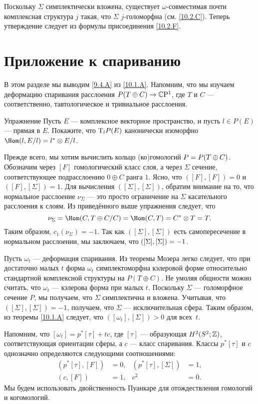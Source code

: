 Поскольку $\Sigma$ симплектически вложена, существует
$\omega$-совместимая почти комплексная структура $j$ такая, что
$\Sigma$ $j$-голоморфна (см. \ref{10.2.C}). 
Теперь утверждение следует из формулы присоединения \ref{10.2.F}. 
\qeds


\section{Приложение к спариванию}\label{sec:10.3}

В этом разделе мы выводим \ref{9.4.A} из \ref{10.1.A}.
Напомним, что мы изучаем деформацию спаривания расслоения $P(T \oplus C) \to \mathbb{C}\mathrm{P}^1$, где $T$ и $C$ — соответственно, тавтологическое и тривиальное расслоения. 

\begin{ex*}{Упражнение}
Пусть $E$ — комплексное векторное пространство, и пусть $l \in P(E)$
— прямая в $E$. 
Покажите, что $\mathrm{T}_l P(E)$ канонически изоморфно $\Hom(l, E/l) = l^\ast \otimes E/l$.
\end{ex*}

Прежде всего, мы хотим вычислить кольцо (ко)гомологий $P \z= P(T \oplus C)$.
Обозначим через $[F]$ гомологический класс слоя, а через $\Sigma$
сечение, соответствующее подрасслоению $0\oplus C$ ранга $1$. 
Ясно, что $([F], [F]) = 0$ и $([F], [\Sigma]) = 1$.
Для вычисления $([\Sigma], [\Sigma])$, обратим внимание на то, что
нормальное расслоение $\nu_\Sigma$ — это просто ограничение на
$\Sigma$ касательного расслоения к слоям. 
Из приведённого выше упражнения следует, что 
\[\nu_\Sigma = \Hom(C, T \oplus C/C) = \Hom(C, T) = C^\ast \otimes T = T.\]
Таким образом, $c_1 (\nu_\Sigma) = -1$. 
Так как $([\Sigma], [\Sigma])$ есть самопересечение в нормальном расслоении,
мы заключаем, что $([\Sigma], [\Sigma]) \z= -1$.

Пусть $\omega_t$ — деформация спаривания.
Из теоремы Мозера \cite{MS} легко следует, что при достаточно малых
$t$ форма $\omega_t$ симплектоморфна кэлеровой форме относительно
стандартной комплексной структуры на $P(T \oplus C)$. 
Не умоляя общности можно считать, что $\omega_t$ — кэлерова
форма при малых $t$. 
Поскольку $\Sigma$ — голоморфное сечение $P$, мы получаем, что
$\Sigma$ симплектична и вложена. 
Учитывая, что $([\Sigma], [\Sigma]) = -1$, получаем, что $\Sigma$ —
исключительная сфера. 
Таким образом, из теоремы \ref{10.1.A} следует, что $([\omega_t],
[\Sigma]) > 0$ для всех~$t$. 

Напомним, что $[\omega_t] = p^\ast [\tau] + tc$, где $[\tau]$ —
образующая $H^2 (S^2;\mathbb{Z})$, соответствующая ориентации сферы, а $c$ — класс спаривания.  
Классы $p^\ast [\tau]$ и $c$ однозначно определяются следующими соотношениями: 
\begin{align*}
(p^\ast [\tau], [F]) &= 0,
&
(p^\ast [\tau], [\Sigma]) &= 1,
\\
(c, [F]) &= 1,
&
c^2 &= 0.
\end{align*}
Мы будем использовать двойственность Пуанкаре для отождествления гомологий и когомологий.

